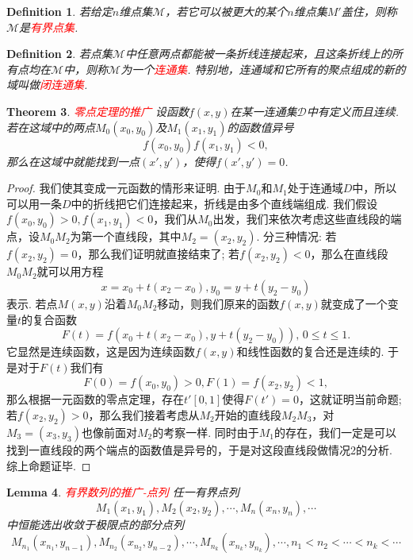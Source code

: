 \documentclass{article}
\newtheorem{theorem}{Theorem}[section]
\newtheorem{lemma}[theorem]{Lemma}
\newtheorem{definition}[theorem]{Definition}
\newcommand{\redt}[1]{\textcolor{red}{#1}}
\begin{document}
\begin{definition}
\rm 若给定$n$维点集$\mathcal{M}$，若它可以被更大的某个$n$维点集$M'$盖住，则称$\mathcal{M}$是\redt{有界点集}. 
\end{definition}

\begin{definition}
\rm 若点集$\mathcal{M}$中任意两点都能被一条折线连接起来，且这条折线上的所有点均在$\mathcal{M}$中，则称$\mathcal{M}$为一个\redt{连通集}. 特别地，连通域和它所有的聚点组成的新的域叫做\redt{闭连通集}.  
\end{definition}

\begin{theorem}
\rm \redt{零点定理的推广} 设函数$f(x,y)$在某一连通集$\mathcal{D}$中有定义而且连续. 若在这域中的两点$M_0(x_0,y_0)$及$M_1(x_1,y_1)$的函数值异号
$$
f(x_0,y_0)f(x_1,y_1) < 0,
$$
那么在这域中就能找到一点$(x',y')$，使得$f(x',y') = 0$.
\end{theorem}

\begin{proof}
我们使其变成一元函数的情形来证明. 由于$M_0$和$M_1$处于连通域$D$中，所以可以用一条$D$中的折线把它们连接起来，折线是由多个直线端组成. 我们假设$f(x_0,y_0) > 0,f(x_1,y_1) < 0$，我们从$M_0$出发，我们来依次考虑这些直线段的端点，设$M_0M_2$为第一个直线段，其中$M_2=(x_2,y_2)$. 分三种情况: 若$f(x_2,y_2) = 0$，那么我们证明就直接结束了; 若$f(x_2,y_2) < 0$，那么在直线段$M_0M_2$就可以用方程
$$
x = x_0  + t(x_2 - x_0), y_0 = y + t(y_2-y_0)
$$
表示. 若点$M(x,y)$沿着$M_0M_2$移动，则我们原来的函数$f(x,y)$就变成了一个变量$t$的复合函数
$$
F(t) = f(x_0  + t(x_2 - x_0),y + t(y_2-y_0)), \, 0 \leq t \leq 1.
$$
它显然是连续函数，这是因为连续函数$f(x,y)$和线性函数的复合还是连续的. 于是对于$F(t)$我们有
$$
F(0) = f(x_0,y_0) > 0, F(1) = f(x_2,y_2) < 1,
$$
那么根据一元函数的零点定理，存在$t' [0,1]$使得$F(t') = 0$，这就证明当前命题; 若$f(x_2,y_2) > 0$，那么我们接着考虑从$M_2$开始的直线段$M_2M_3$，对$M_3=(x_3,y_3)$也像前面对$M_2$的考察一样. 同时由于$M_1$的存在，我们一定是可以找到一直线段的两个端点的函数值是异号的，于是对这段直线段做情况2的分析. 综上命题证毕.   
\end{proof}

\begin{lemma}\label{point-sequence: bounded-then-coverage}
\rm \redt{有界数列的推广-点列} 任一有界点列
$$
M_1(x_1,y_1), M_2(x_2,y_2), \cdots , M_n(x_n,y_n),\cdots
$$
中恒能选出收敛于极限点的部分点列
$$
M_{n_1}(x_{n_1},y_{n-1}),M_{n_2}(x_{n_2},y_{n-2}),\cdots,M_{n_k}(x_{n_k},y_{n_k}),\cdots, n_1 < n_2 < \cdots < n_k <\cdots
$$
\end{lemma}
\end{document}
